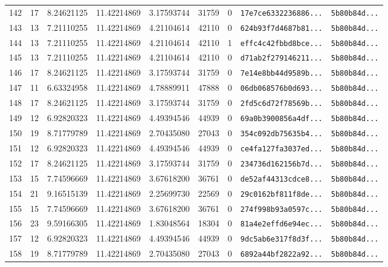 \documentclass[10pt]{article}
\begin{document}
\begin{longtable}{rrrrrrrll}
  142 & 17 & 8.24621125 & 11.42214869 & 3.17593744 & 31759 & 0 & \texttt{17e7ce6332236886...} & \texttt{5b80b84d...} \\
  143 & 13 & 7.21110255 & 11.42214869 & 4.21104614 & 42110 & 0 & \texttt{624b93f7d4687b81...} & \texttt{5b80b84d...} \\
  \rowcolor{cmpink!20} 144 & 13 & 7.21110255 & 11.42214869 & 4.21104614 & 42110 & 1 & \texttt{effc4c42fbbd8bce...} & \texttt{5b80b84d...} \\
  145 & 13 & 7.21110255 & 11.42214869 & 4.21104614 & 42110 & 0 & \texttt{d71ab2f279146211...} & \texttt{5b80b84d...} \\
  146 & 17 & 8.24621125 & 11.42214869 & 3.17593744 & 31759 & 0 & \texttt{7e14e8bb44d9589b...} & \texttt{5b80b84d...} \\
  147 & 11 & 6.63324958 & 11.42214869 & 4.78889911 & 47888 & 0 & \texttt{06db068576b0d693...} & \texttt{5b80b84d...} \\
  148 & 17 & 8.24621125 & 11.42214869 & 3.17593744 & 31759 & 0 & \texttt{2fd5c6d72f78569b...} & \texttt{5b80b84d...} \\
  149 & 12 & 6.92820323 & 11.42214869 & 4.49394546 & 44939 & 0 & \texttt{69a0b3900856a4df...} & \texttt{5b80b84d...} \\
  150 & 19 & 8.71779789 & 11.42214869 & 2.70435080 & 27043 & 0 & \texttt{354c092db75635b4...} & \texttt{5b80b84d...} \\
  151 & 12 & 6.92820323 & 11.42214869 & 4.49394546 & 44939 & 0 & \texttt{ce4fa127fa3037ed...} & \texttt{5b80b84d...} \\
  152 & 17 & 8.24621125 & 11.42214869 & 3.17593744 & 31759 & 0 & \texttt{234736d162156b7d...} & \texttt{5b80b84d...} \\
  153 & 15 & 7.74596669 & 11.42214869 & 3.67618200 & 36761 & 0 & \texttt{de52af44313cdce8...} & \texttt{5b80b84d...} \\
  154 & 21 & 9.16515139 & 11.42214869 & 2.25699730 & 22569 & 0 & \texttt{29c0162bf811f8de...} & \texttt{5b80b84d...} \\
  155 & 15 & 7.74596669 & 11.42214869 & 3.67618200 & 36761 & 0 & \texttt{274f998b93a0597c...} & \texttt{5b80b84d...} \\
  156 & 23 & 9.59166305 & 11.42214869 & 1.83048564 & 18304 & 0 & \texttt{81a4e2effd6e94ec...} & \texttt{5b80b84d...} \\
  157 & 12 & 6.92820323 & 11.42214869 & 4.49394546 & 44939 & 0 & \texttt{9dc5ab6e317f8d3f...} & \texttt{5b80b84d...} \\
  158 & 19 & 8.71779789 & 11.42214869 & 2.70435080 & 27043 & 0 & \texttt{6892a44bf2822a92...} & \texttt{5b80b84d...} \\

\end{longtable}
\end{document}
